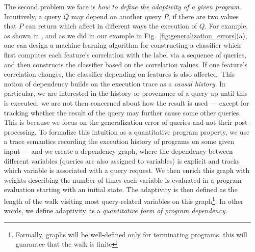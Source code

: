 The second problem we face is \emph{how to define the adaptivity of a given program}.
Intuitively, a query $Q$ may depend on another query $P$, if there are two values that $P$ can return which affect in different ways the execution of $Q$. 
For example, as shown in \cite{dwork2015reusable}, and as we did in our example in Fig.~\ref{fig:generalization_errors}(a), one can design a machine learning algorithm for constructing a classifier which first computes each feature's correlation with the label via a sequence of queries, and then constructs the classifier based on the correlation values. If one feature's correlation changes, the classifier depending on features is also affected.  
This notion of dependency builds on the execution trace as a \emph{causal history}. In particular, we are interested in the history or provenance of a query up until this is executed, we are not then concerned about how the result is used --- except for tracking whether the result of the query may further cause some other queries. This is because we focus on the generalization error of queries and not their post-processing. %
To formalize this intuition as a quantitative program property,
we use a trace semantics recording the execution history of programs on some given input --- and we create a dependency graph, where the dependency between different variables (queries are also assigned to variables) is explicit and tracks which variable is associated with a query request. We then enrich this graph with weights describing the number of times each variable is evaluated in a program evaluation starting with an initial state. The adaptivity is then defined as the length of the walk visiting most query-related variables on this graph\footnote{Formally, graphs will be well-defined only for terminating programs, this will guarantee that the walk is finite}. In other words, we define adaptivity as a \emph{quantitative form of program dependency}.


